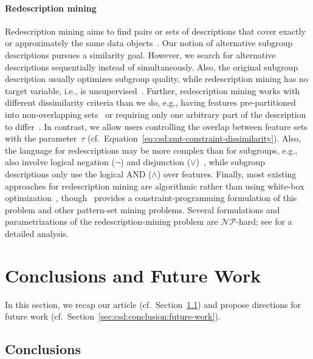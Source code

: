 \documentclass{article}
\theoremstyle{definition}
\begin{document}
\paragraph{Redescription mining}

Redescription mining aims to find pairs or sets of descriptions that cover exactly or approximately the same data objects~\cite{galbrun2017redescription, ramakrishnan2004turning}.
Our notion of alternative subgroup descriptions pursues a similarity goal.
However, we search for alternative descriptions sequentially instead of simultaneously.
Also, the original subgroup description usually optimizes subgroup quality, while redescription mining has no target variable, i.e., is unsupervised~\cite{ramakrishnan2004turning}.
Further, redescription mining works with different dissimilarity criteria than we do, e.g., having features pre-partitioned into non-overlapping sets~\cite{galbrun2017redescription, gallo2008finding, mihelcic2023complexity} or requiring only one arbitrary part of the description to differ~\cite{parida2005redescription}.
In contrast, we allow users controlling the overlap between feature sets with the parameter~$\tau$ (cf.~Equation~\ref{eq:csd:smt-constraint-dissimilarity}).
Also, the language for redescriptions may be more complex than for subgroups, e.g., also involve logical negation ($\lnot$) and disjunction ($\lor$)~\cite{galbrun2017redescription, gallo2008finding}, while subgroup descriptions only use the logical AND ($\land$) over features.
Finally, most existing approaches for redescription mining are algorithmic rather than using white-box optimization~\cite{galbrun2017redescription, mihelcic2023complexity}, though~\cite{guns2013kpattern} provides a constraint-programming formulation of this problem and other pattern-set mining problems.
Several formulations and parametrizations of the redescription-mining problem are $\mathcal{NP}$-hard; see \cite{mihelcic2023complexity} for a detailed analysis.

\section{Conclusions and Future Work}
\label{sec:csd:conclusion}

In this section, we recap our article (cf.~Section~\ref{sec:csd:conclusion:conclusion}) and propose directions for future work (cf.~Section~\ref{sec:csd:conclusion:future-work}).

\subsection{Conclusions}
\label{sec:csd:conclusion:conclusion}
\end{document}
